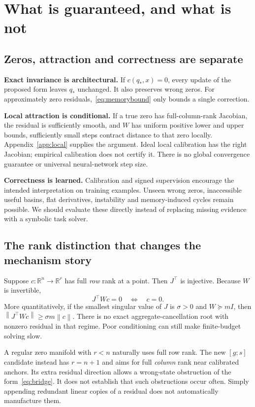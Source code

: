 \documentclass[11pt,a4paper]{article}
\newcommand{\norm}[1]{\left\lVert #1\right\rVert}
\newcommand{\newtopic}{\clearpage}
\begin{document}
\newtopic
\section{What is guaranteed, and what is not}\label{sec:claims}
\subsection{Zeros, attraction and correctness are separate}
\textbf{Exact invariance is architectural.} If $c(q_*,x)=0$, every update of the proposed form leaves $q_*$ unchanged. It also preserves wrong zeros. For approximately zero residuals,~\eqref{eq:memorybound} only bounds a single correction.

\textbf{Local attraction is conditional.} If a true zero has full-column-rank Jacobian, the residual is sufficiently smooth, and $W$ has uniform positive lower and upper bounds, sufficiently small steps contract distance to that zero locally. Appendix~\ref{app:local} supplies the argument. Ideal local calibration has the right Jacobian; empirical calibration does not certify it. There is no global convergence guarantee or universal neural-network step size.

\textbf{Correctness is learned.} Calibration and signed supervision encourage the intended interpretation on training examples. Unseen wrong zeros, inaccessible useful basins, flat derivatives, instability and memory-induced cycles remain possible. We should evaluate these directly instead of replacing missing evidence with a symbolic task solver.

\subsection{The rank distinction that changes the mechanism story}
Suppose $c:\mathbb R^n\to\mathbb R^r$ has full \emph{row} rank at a point. Then $J^\top$ is injective. Because $W$ is invertible,
\begin{equation}
J^\top Wc=0\quad\Longleftrightarrow\quad c=0.\label{eq:rank}
\end{equation}
More quantitatively, if the smallest singular value of $J$ is $\sigma>0$ and $W\succeq mI$, then $\norm{J^\top Wc}\ge\sigma m\norm{c}$. There is no exact aggregate-cancellation root with nonzero residual in that regime. Poor conditioning can still make finite-budget solving slow.

A regular zero manifold with $r<n$ naturally uses full row rank. The new $[g;s]$ candidate instead has $r=n+1$ and aims for full \emph{column} rank near calibrated anchors. Its extra residual direction allows a wrong-state obstruction of the form~\eqref{eq:bridge}. It does not establish that such obstructions occur often. Simply appending redundant linear copies of a residual does not automatically manufacture them.
\end{document}
